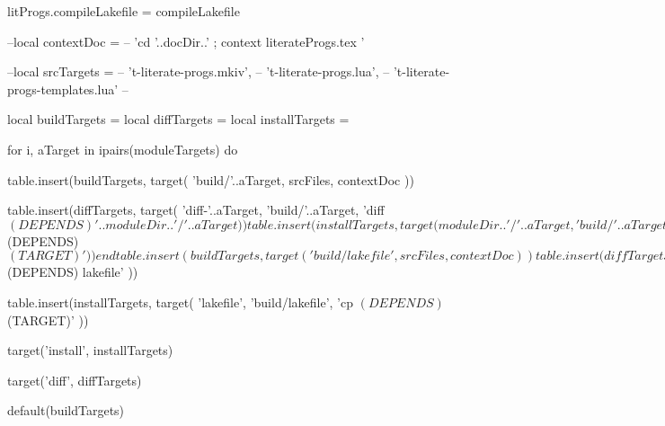 litProgs.compileLakefile = compileLakefile
\stopLuaCode

\startLakefile
--local contextDoc = 
--  'cd '..docDir..' ; context literateProgs.tex '

--local srcTargets = {
--  't-literate-progs.mkiv',
--  't-literate-progs.lua',
--  't-literate-progs-templates.lua'
--}

local buildTargets   = { }
local diffTargets    = { }
local installTargets = { }

for i, aTarget in ipairs(moduleTargets) do

  table.insert(buildTargets, target(
    'build/'..aTarget,
    srcFiles,
    contextDoc
  ))

  table.insert(diffTargets, target(
    'diff-'..aTarget,
    'build/'..aTarget,
    'diff $(DEPENDS) '..moduleDir..'/'..aTarget
  ))

  table.insert(installTargets, target(
    moduleDir..'/'..aTarget,
    'build/'..aTarget,
    'cp $(DEPENDS) $(TARGET)'
  ))
end

table.insert(buildTargets, target(
  'build/lakefile',
  srcFiles,
  contextDoc
))

table.insert(diffTargets, target(
  'diff-lakefile',
  'build/lakefile',
  'diff $(DEPENDS) lakefile'
))

table.insert(installTargets, target(
  'lakefile',
  'build/lakefile',
  'cp $(DEPENDS) $(TARGET)'
))

target('install', installTargets)

target('diff', diffTargets)

default(buildTargets)
\stopLakefile

\stopchapter